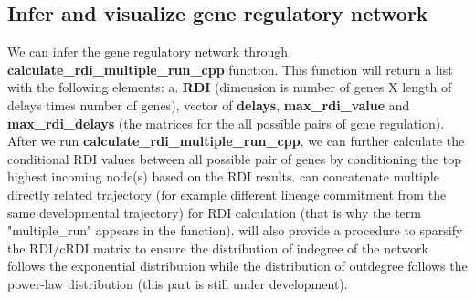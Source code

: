 \documentclass[10pt,oneside]{article}\usepackage[]{graphicx}\usepackage[]{color}
\begin{document}
\subsection{Infer and visualize gene regulatory network}

We can infer the gene regulatory network through \textbf{calculate\_rdi\_multiple\_run\_cpp} function. This function will return a list with the following elements:
a. \textbf{RDI} (dimension is number of genes X length of delays times number of genes), vector of \textbf{delays}, \textbf{max\_rdi\_value} and \textbf{max\_rdi\_delays} (the matrices for the all possible pairs of gene regulation). After we run \textbf{calculate\_rdi\_multiple\_run\_cpp}, we can further calculate the conditional RDI values between all possible pair of genes by conditioning the top highest incoming node(s) based on the RDI results.  can concatenate multiple directly related trajectory (for example different lineage commitment from the same developmental trajectory) for RDI calculation (that is why the term "multiple\_run" appears in the function).  will also provide a procedure to sparsify the RDI/cRDI matrix to ensure  the distribution of indegree of the network follows the exponential distribution while the distribution of outdegree follows the power-law distribution (this part is still under development).
\end{document}
